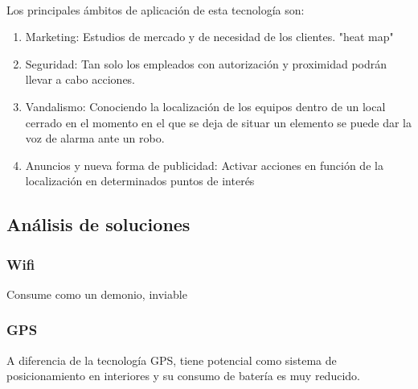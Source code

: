 \documentclass[a4paper ,12pt, onecolumn]{article}
\begin{document}
        \paragraph{}
        Los principales ámbitos de aplicación de esta tecnología son:
        \begin{enumerate}
            \item Marketing: Estudios de mercado y de necesidad de los clientes. "heat map"
            \item Seguridad: Tan solo los empleados con autorización y proximidad podrán llevar a cabo acciones.
            \item Vandalismo: Conociendo la localización de los equipos dentro de un local cerrado en el momento 
            en el que se deja de situar un elemento se puede dar la voz de alarma ante un robo.
            \item Anuncios y nueva forma de publicidad: Activar acciones en función de la localización en determinados puntos de interés
        \end{enumerate}
    \subsection{Análisis de soluciones}
        \subsubsection {Wifi}
        Consume como un demonio, inviable 
        \subsubsection {GPS}
        A diferencia de la tecnología GPS, tiene potencial como sistema de posicionamiento en interiores y su consumo de batería es muy reducido.
\end{document}
